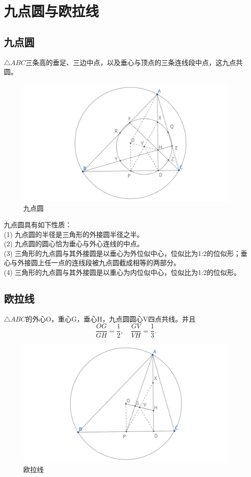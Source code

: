 \section{九点圆与欧拉线}
\subsection{九点圆}
\begin{definition}
    $\triangle ABC$三条高的垂足、三边中点，以及垂心与顶点的三条连线段中点，这九点共圆。
\end{definition}
\begin{figure}[htbp]
    \centering
    \includegraphics[width=\linewidth]{figures/九点圆辅助线.png}
    \caption{九点圆}
\end{figure}
\begin{proposition}[九点圆性质]
    九点圆具有如下性质：\\
    (1) 九点圆的半径是三角形的外接圆半径之半。\\
    (2) 九点圆的圆心恰为垂心与外心连线的中点。\\
    (3) 三角形的九点圆与其外接圆是以垂心为外位似中心，位似比为1:2的位似形；垂心与外接圆上任一点的连线段被九点圆截成相等的两部分。\\
    (4) 三角形的九点圆与其外接圆是以重心为内位似中心，位似比为1:2的位似形。\\
\end{proposition}

\newpage 
\subsection{欧拉线}
\begin{theorem}
    $\triangle ABC$的外心O，重心G，垂心H，九点圆圆心V四点共线。并且
    $$
    \frac{OG}{GH}=\frac{1}{2},\quad 
    \frac{GV}{VH}=\frac{1}{3}.
    $$
\end{theorem}
\begin{figure}[htbp]
    \centering
    \includegraphics[width=\linewidth]{figures/欧拉线.png}
    \caption{欧拉线}
\end{figure}